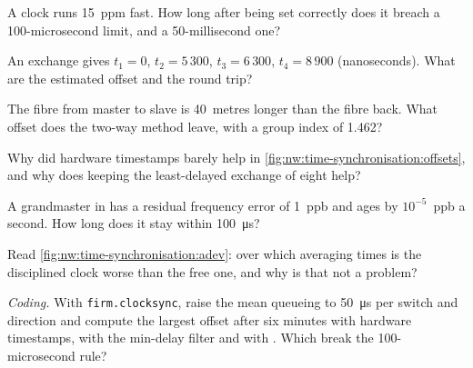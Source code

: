 \begin{exercise}[$\star$]\label{exo:nw:time-synchronisation:1}
A clock runs 15~ppm fast. How long after being set correctly does it breach a 100-microsecond limit, and a 50-millisecond one?
\end{exercise}

\begin{exercise}[$\star$]\label{exo:nw:time-synchronisation:2}
An exchange gives $t_1 = 0$, $t_2 = 5\,300$, $t_3 = 6\,300$, $t_4 = 8\,900$ (nanoseconds). What are the estimated offset and the round
trip?
\end{exercise}

\begin{exercise}[$\star$]\label{exo:nw:time-synchronisation:3}
The fibre from master to slave is 40~metres longer than the fibre back. What offset does the two-way method leave, with a group
index of 1.462?
\end{exercise}

\begin{exercise}[$\star\star$]\label{exo:nw:time-synchronisation:4}
Why did hardware timestamps barely help in \cref{fig:nw:time-synchronisation:offsets}, and why does keeping the least-delayed exchange
of eight help?
\end{exercise}

\begin{exercise}[$\star\star$]\label{exo:nw:time-synchronisation:5}
A grandmaster in  has a residual frequency error of 1~ppb and ages by $10^{-5}$~ppb a second. How long does it stay within
\qty{100}{\micro\second}?
\end{exercise}

\begin{exercise}[$\star\star$]\label{exo:nw:time-synchronisation:6}
Read \cref{fig:nw:time-synchronisation:adev}: over which averaging times is the disciplined clock worse than the free one, and why is
that not a problem?
\end{exercise}

\begin{exercise}[$\star\star\star$]\label{exo:nw:time-synchronisation:7}
\emph{Coding.} With \texttt{firm.clocksync}, raise the mean queueing to \qty{50}{\micro\second} per switch and direction and compute the
largest offset after six minutes with hardware timestamps, with the min-delay filter and with . Which break the
100-microsecond rule?
\end{exercise}

